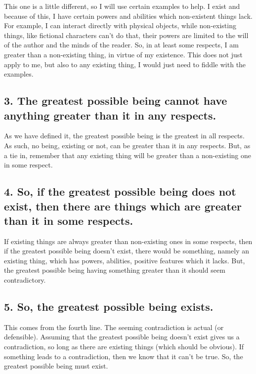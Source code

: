 This one is a little different, so I will use certain examples to help. I exist and because of this, I have certain powers and abilities which non-existent things lack. For example, I can interact directly with physical objects, while non-existing things, like fictional characters can't do that, their powers are limited to the will of the author and the minds of the reader. So, in at least some respects, I am greater than a non-existing thing, in virtue of my existence. This does not just apply to me, but also to any existing thing, I would just need to fiddle with the examples. 

\subsection{3. The greatest possible being cannot have anything greater than it in any respects.}

As we have defined it, the greatest possible being is the greatest in all respects. As such, no being, existing or not, can be greater than it in any respects. But, as a tie in, remember that any existing thing will be greater than a non-existing one in some respect.

\subsection{4. So, if the greatest possible being does not exist, then there are things which are greater than it in some respects.}

If existing things are always greater than non-existing ones in some respects, then if the greatest possible being doesn't exist, there would be something, namely an existing thing, which has powers, abilities, positive features which it lacks. But, the greatest possible being having something greater than it should seem contradictory. 

\subsection{5. So, the greatest possible being exists.}

This comes from the fourth line. The seeming contradiction is actual (or defensible). Assuming that the greatest possible being doesn't exist gives us a contradiction, so long as there are existing things (which should be obvious). If something leads to a contradiction, then we know that it can't be true. So, the greatest possible being must exist. 

